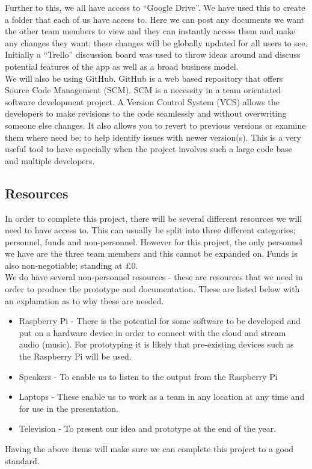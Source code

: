 Further to this, we all have access to ``Google Drive''.  We have used this to create a folder that each of us have access to.  Here we can post any documents we want the other team members to view and they can instantly access them and make any changes they want; these changes will be globally updated for all users to see.  \\
Initially a ``Trello'' discussion board was used to throw ideas around and discuss potential features of the app as well as a broad business model. \\
We will also be using GitHub.  GitHub is a web based repository that offers Source Code Management (SCM).  SCM is a necessity in a team orientated software development project.  A Version Control System (VCS) allows the developers to make revisions to the code seamlessly and without overwriting someone else changes.  It also allows you to revert to previous versions or examine them where need be; to help identify issues with newer version(s).  This is a very useful tool to have especially when the project involves such a large code base and multiple developers.

\subsection{Resources}
In order to complete this project, there will be several different resources we will need to have access to.  This can usually be split into three different categories; personnel, funds and non-personnel.  However for this project, the only personnel we have are the three team members and this cannot be expanded on.  Funds is also non-negotiable; standing at £0.  \\
We do have several non-personnel resources - these are resources that we need in order to produce the prototype and documentation.  These are listed below with an explanation as to why these are needed.
\begin{itemize}
\item Raspberry Pi - There is the potential for some software to be developed and put on a hardware device in order to connect with the cloud and stream audio (music).  For prototyping it is likely that pre-existing devices such as the Raspberry Pi will be used.
\item Speakers - To enable us to listen to the output from the Raspberry Pi
\item Laptops - These enable us to work as a team in any location at any time and for use in the presentation.
\item Television - To present our idea and prototype at the end of the year.
\end{itemize}
Having the above items will make sure we can complete this project to a good standard.

